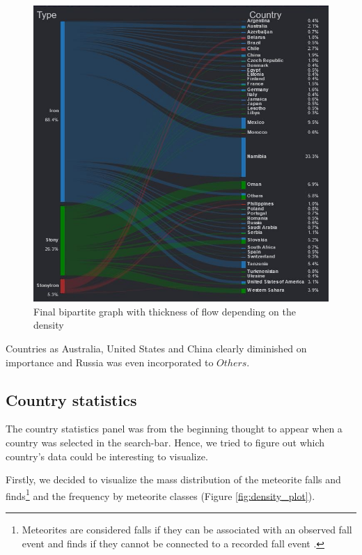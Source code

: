 \documentclass[10pt,conference,compsocconf]{IEEEtran}
\begin{document}
\begin{figure}[H]
  \centering
  \includegraphics[height=\columnwidth]{images/bipartite_density}
  \vspace{-3mm}
  \caption{Final bipartite graph with thickness of flow depending on the density}
  \label{fig:bipartite_density}
\end{figure}

Countries as Australia, United States and China clearly diminished on importance and Russia was even incorporated to $Others$.

\subsection{Country statistics}
The country statistics panel was from the beginning thought to appear when a country was selected in the search-bar. Hence, we tried to figure out which country's data  could be interesting to visualize. 

Firstly, we decided to visualize the mass distribution of the meteorite falls and finds\footnote{Meteorites are considered falls if they can be
associated with an observed fall event and finds if they
cannot be connected to a recorded fall event \cite{weisberg_systematics_2006}.} and the frequency by meteorite classes (Figure \ref{fig:density_plot}).
\end{document}
